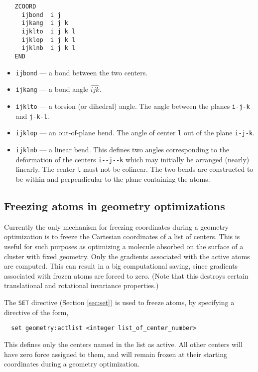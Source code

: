 \begin{verbatim}
   ZCOORD
     ijbond  i j
     ijkang  i j k
     ijklto  i j k l
     ijklop  i j k l
     ijklnb  i j k l
   END
\end{verbatim}

\begin{itemize}
\item {\tt ijbond} --- a bond between the two centers.
\item {\tt ijkang} --- a bond angle $\widehat{ijk}$.
\item {\tt ijklto} --- a torsion (or dihedral) angle.  The
  angle between the planes \verb+i-j-k+ and \verb+j-k-l+.
\item {\tt ijklop} --- an out-of-plane bend.  The angle of center
  \verb+l+ out of the plane \verb+i-j-k+.
\item {\tt ijklnb} --- a linear bend.  This defines two angles
  corresponding to the deformation of the centers \verb+i--j--k+ 
  which may initially be arranged (nearly) linearly.  The center
  \verb+l+ must not be colinear.  The two bends are constructed to be
  within and perpendicular to the plane containing the atoms.
\end{itemize}   

\subsection{Freezing atoms in geometry optimizations}
\label{sec:activeatoms}

Currently the only mechanism for freezing coordinates during a
geometry optimization is to freeze the Cartesian coordinates of a list
of centers.  This is useful for such purposes as optimizing a molecule
absorbed on the surface of a cluster with fixed geometry.  Only the
gradients associated with the active atoms are computed.  This can
result in a big computational saving, since gradients associated with
frozen atoms are forced to zero.  (Note that this destroys certain
translational and rotational invariance properties.)

The \verb+SET+ directive (Section \ref{sec:set}) is used to freeze
atoms, by specifying a directive of the form,
\begin{verbatim}
  set geometry:actlist <integer list_of_center_number>
\end{verbatim}
This defines only the centers named in the list as active.  All
other 
centers will have zero force assigned to them, and will remain frozen
at their starting coordinates during a geometry optimization.

